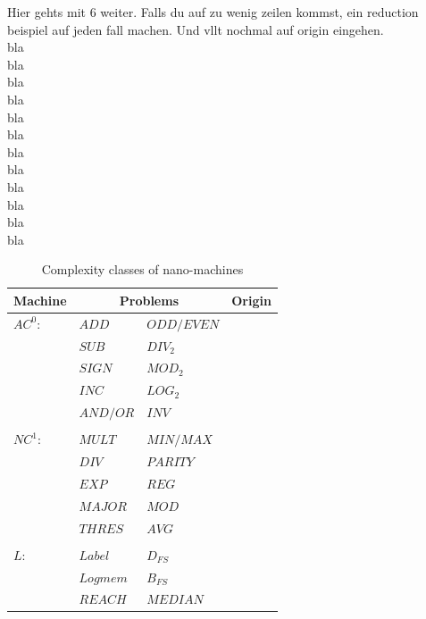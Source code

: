 \documentclass[10pt,sigconf]{acmart}
\begin{document}
Hier gehts mit 6 weiter.
Falls du auf zu wenig zeilen kommst, ein reduction beispiel auf jeden fall machen. Und vllt nochmal auf origin eingehen.
\\
bla\\
bla\\bla\\
bla\\
bla\\bla\\
bla\\
bla\\bla\\
bla\\
bla\\bla\\

\begin{table}
\begin{tabular}{ p{1.5cm}|p{2cm} p{2cm}|p{1.5cm} }
  \hline
  Machine & \multicolumn{2}{c|}{Problems}  & Origin\\
  \hline
  $AC^0$: & $ADD$ & $ODD/EVEN$&  \\
          & $SUB$ & $DIV_{2}$&  \\
          & $SIGN$ & $MOD_{2}$&  \\
          & $INC$ & $LOG_{2}$&  \\
          & $AND/OR$ & $INV$&  \\
          &  & &  \\
  $NC^1$:   & $MULT$ &$MIN/MAX$   & \\
           & $DIV$ & $PARITY$&  \\
           & $EXP$ & $REG$&  \\
           & $MAJOR$ & $MOD$&  \\
           & $THRES$ & $AVG$&  \\
           &  & &  \\
  $L$:      &   $Label$ &$D_{FS}$ &     \\
           & $Log mem$ & $B_{FS}$&  \\
           & $REACH$ & $MEDIAN$&  \\
          
  \hline 
  \end{tabular}\\
  
  \caption{Complexity classes of nano-machines}
  \label{table1}
  \end{table}
  
\end{document}
